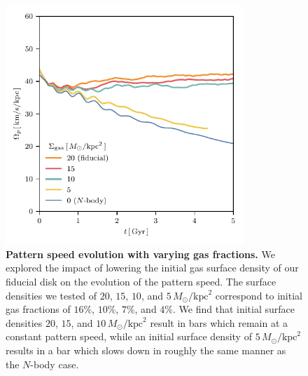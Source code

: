 \documentclass{natureprintstyle}
\newcommand{\Nbody}{$N$-body}
\newcommand{\Msun}{\ensuremath{M_{\odot}}}
\begin{document}
\begin{figure}[t!]%
\centering
\includegraphics[width=9cm]{fig/fig-fgas.pdf}
\caption{\textbf{Pattern speed evolution with varying gas fractions.} We
explored the impact of lowering the initial gas surface density of our
fiducial disk on the evolution of the pattern speed. The surface densities we
tested of $20$, $15$, $10$, and $5\,\Msun/\textrm{kpc}^2$ correspond to
initial gas fractions of $16\%$, $10\%$, $7\%$, and $4\%$. We find that
initial surface densities $20$, $15$, and $10\,\Msun/\textrm{kpc}^2$ result in
bars which remain at a constant pattern speed, while an initial surface
density of $5\,\Msun/\textrm{kpc}^2$ results in a bar which slows down in
roughly the same manner as the \Nbody{} case. }
\label{fig:fgas}
\end{figure}
\end{document}
